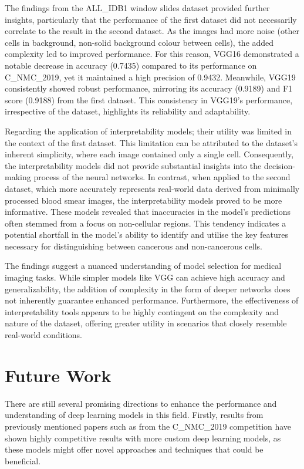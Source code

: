 \documentclass[
	a4paper,
	10pt,
	unnumberedsections,
	twoside,
]{research_article}
\begin{document}
The findings from the ALL\_IDB1 window slides dataset provided further insights, particularly that the performance of the first dataset did not necessarily correlate to the result in the second dataset. As the images had more noise (other cells in background, non-solid background colour between cells), the added complexity led to improved performance. For this reason, VGG16 demonstrated a notable decrease in accuracy (0.7435) compared to its performance on C\_NMC\_2019, yet it maintained a high precision of 0.9432. Meanwhile, VGG19 consistently showed robust performance, mirroring its accuracy (0.9189) and F1 score (0.9188) from the first dataset. This consistency in VGG19's performance, irrespective of the dataset, highlights its reliability and adaptability.

Regarding the application of interpretability models; their utility was limited in the context of the first dataset. This limitation can be attributed to the dataset's inherent simplicity, where each image contained only a single cell. Consequently, the interpretability models did not provide substantial insights into the decision-making process of the neural networks. In contrast, when applied to the second dataset, which more accurately represents real-world data derived from minimally processed blood smear images, the interpretability models proved to be more informative. These models revealed that inaccuracies in the model's predictions often stemmed from a focus on non-cellular regions. This tendency indicates a potential shortfall in the model's ability to identify and utilise the key features necessary for distinguishing between cancerous and non-cancerous cells.

The findings suggest a nuanced understanding of model selection for medical imaging tasks. While simpler models like VGG can achieve high accuracy and generalizability, the addition of complexity in the form of deeper networks does not inherently guarantee enhanced performance. Furthermore, the effectiveness of interpretability tools appears to be highly contingent on the complexity and nature of the dataset, offering greater utility in scenarios that closely resemble real-world conditions.


\section{Future Work}

There are still several promising directions to enhance the performance and understanding of deep learning models in this field. Firstly, results from previously mentioned papers such as from the C\_NMC\_2019 competition have shown highly competitive results with more custom deep learning models, as these models might offer novel approaches and techniques that could be beneficial.
\end{document}
